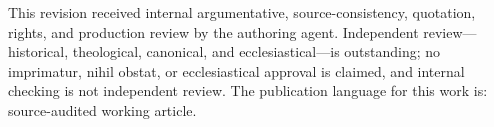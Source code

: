 This revision received internal argumentative, source-consistency, quotation, rights, and production review by the authoring agent. Independent review---historical, theological, canonical, and ecclesiastical---is outstanding; no imprimatur, nihil obstat, or ecclesiastical approval is claimed, and internal checking is not independent review. The publication language for this work is: source-audited working article.
